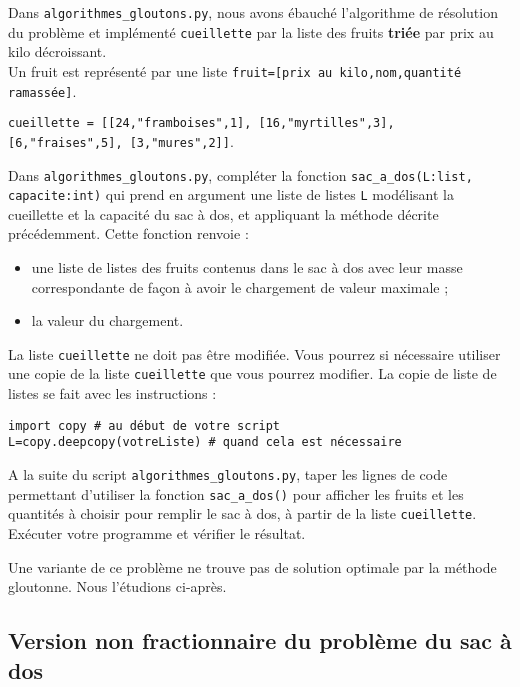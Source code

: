 Dans \lstinline{algorithmes_gloutons.py}, nous avons ébauché l'algorithme de résolution du problème et implémenté \lstinline{cueillette} par la liste des fruits \textbf{triée} par prix au kilo décroissant.\\
Un fruit est représenté par une liste \lstinline{fruit=[prix au kilo,nom,quantité ramassée]}.

\lstinline{cueillette = [[24,"framboises",1], [16,"myrtilles",3], [6,"fraises",5], [3,"mures",2]]}.

\begin{question}
Dans \lstinline{algorithmes_gloutons.py}, compléter la fonction \lstinline{sac_a_dos(L:list, capacite:int)} qui prend en argument une liste de listes \lstinline{L} modélisant la cueillette et la capacité du sac à dos, et appliquant la méthode décrite précédemment. Cette fonction renvoie :
\begin{itemize}
\item une liste de listes des fruits contenus dans le sac à dos avec leur masse correspondante de façon à avoir le chargement de valeur maximale ;
\item la valeur du chargement.
\end{itemize}
\end{question}

La liste \lstinline{cueillette} ne doit pas être modifiée. Vous pourrez si nécessaire utiliser une copie de la liste  \lstinline{cueillette} que vous pourrez modifier. La copie de liste de listes se fait avec les instructions :

\begin{lstlisting}
import copy # au début de votre script
L=copy.deepcopy(votreListe) # quand cela est nécessaire
\end{lstlisting}

\begin{question}
A la suite du script \lstinline{algorithmes_gloutons.py}, taper les lignes de code permettant d’utiliser la fonction \lstinline{sac_a_dos()} pour afficher les  fruits et les quantités à choisir pour remplir le sac à dos, à partir de la liste \lstinline{cueillette}. Exécuter votre programme et vérifier le résultat.
\end{question}


\vspace*{0.5cm}
Une variante de ce problème ne trouve pas de solution optimale par la méthode gloutonne. Nous l'étudions ci-après.

\subsection*{Version non fractionnaire du problème du sac à dos}
\label{sec:VersionNonFractionnaireDuProblèmeDuSacÀDos}


